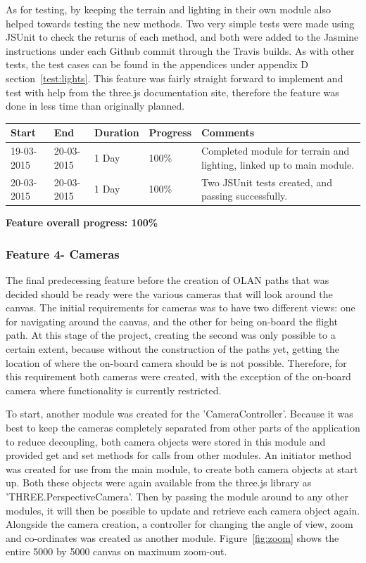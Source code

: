 As for testing, by keeping the terrain and lighting in their own module also helped towards testing the new methods. Two very simple tests were made using JSUnit to check the returns of each method, and both were added to the Jasmine instructions under each Github commit through the Travis builds. As with other tests, the test cases can be found in the appendices under appendix D section~\ref{test:lights}. This feature was fairly straight forward to implement and test with help from the three.js documentation site, therefore the feature was done in less time than originally planned.

\begin{table}[h]
\begin{tabular}{|l|l|l|l|p{7cm}|}
\hline
\textbf{Start} & \textbf{End} & \textbf{Duration} & \textbf{Progress} & \textbf{Comments}                                                                                                     \\ \hline
19-03-2015     & 20-03-2015   & 1 Day            & 100\%             &  Completed module for terrain and lighting, linked up to main module.\\ \hline
20-03-2015     & 20-03-2015   & 1 Day            & 100\%             &  Two JSUnit tests created, and passing successfully.\\ \hline
\end{tabular}
\end{table}

\textbf{Feature overall progress: 100\%}

\subsubsection{Feature 4- Cameras}
The final predecessing feature before the creation of OLAN paths that was decided should be ready were the various cameras that will look around the canvas. The initial requirements for cameras was to have two different views: one for navigating around the canvas, and the other for being on-board the flight path. At this stage of the project, creating the second was only possible to a certain extent, because without the construction of the paths yet, getting the location of where the on-board camera should be is not possible. Therefore, for this requirement both cameras were created, with the exception of the on-board camera where functionality is currently restricted. 

To start, another module was created for the 'CameraController'. Because it was best to keep the cameras completely separated from other parts of the application to reduce decoupling, both camera objects were stored in this module and provided get and set methods for calls from other modules. An initiator method was created for use from the main module, to create both camera objects at start up. Both these objects were again available from the three.js library as 'THREE.PerspectiveCamera'. Then by passing the module around to any other modules, it will then be possible to update and retrieve each camera object again. Alongside the camera creation, a controller for changing the angle of view, zoom and co-ordinates was created as another module. Figure~\ref{fig:zoom} shows the entire 5000 by 5000 canvas on maximum zoom-out.

